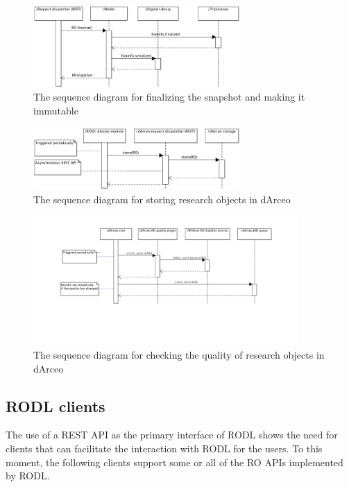 \begin{figure}[!hb]
\centering
\includegraphics[width=0.7\textwidth]{Figures/RODL/SnapshotFinalize.png}
\caption{The sequence diagram for finalizing the snapshot and making it immutable}
\label{SnapshotFinalize}
\end{figure}

\begin{figure}[!hb]
\centering
\includegraphics[width=0.7\textwidth]{Figures/RODL/dArceoStore.png}
\caption{The sequence diagram for storing research objects in dArceo}
\label{dArceoStore}
\end{figure}

\begin{figure}[!hb]
\centering
\includegraphics[width=0.9\textwidth]{Figures/RODL/dArceoQuality.png}
\caption{The sequence diagram for checking the quality of research objects in dArceo}
\label{dArceoQuality}
\end{figure}

\subsection{RODL clients}

The use of a REST API as the primary interface of RODL shows the need for clients that can facilitate the interaction with RODL for the users. To this moment, the following clients support some or all of the RO APIs implemented by RODL.

